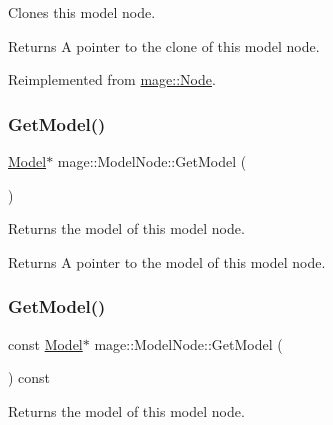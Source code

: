 Clones this model node.

\begin{DoxyReturn}{Returns}
A pointer to the clone of this model node. 
\end{DoxyReturn}


Reimplemented from \hyperlink{classmage_1_1_node_a71a4763bfd4cba5653488b490e61dc8f}{mage\+::\+Node}.

\hypertarget{classmage_1_1_model_node_a8964223fd592fd23949d6f996c40a482}{}\label{classmage_1_1_model_node_a8964223fd592fd23949d6f996c40a482} 
\subsubsection{\texorpdfstring{Get\+Model()}{GetModel()}\hspace{0.1cm}{\footnotesize\ttfamily [1/2]}}
{\footnotesize\ttfamily \hyperlink{classmage_1_1_model}{Model}$\ast$ mage\+::\+Model\+Node\+::\+Get\+Model (\begin{DoxyParamCaption}{ }\end{DoxyParamCaption})\hspace{0.3cm}{\ttfamily [noexcept]}}

Returns the model of this model node.

\begin{DoxyReturn}{Returns}
A pointer to the model of this model node. 
\end{DoxyReturn}
\hypertarget{classmage_1_1_model_node_ad8c4978c4d14ed015fdb517ba86ebd93}{}\label{classmage_1_1_model_node_ad8c4978c4d14ed015fdb517ba86ebd93} 
\subsubsection{\texorpdfstring{Get\+Model()}{GetModel()}\hspace{0.1cm}{\footnotesize\ttfamily [2/2]}}
{\footnotesize\ttfamily const \hyperlink{classmage_1_1_model}{Model}$\ast$ mage\+::\+Model\+Node\+::\+Get\+Model (\begin{DoxyParamCaption}{ }\end{DoxyParamCaption}) const\hspace{0.3cm}{\ttfamily [noexcept]}}

Returns the model of this model node.

